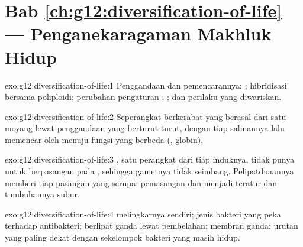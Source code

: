 \section*{Bab \ref{ch:g12:diversification-of-life} --- Penganekaragaman Makhluk Hidup}

\begin{solution}{exo:g12:diversification-of-life:1}
Penggandaan  dan pemencarannya; ;
hibridisasi bersama poliploidi; perubahan pengaturan ;
; dan perilaku yang diwariskan.
\end{solution}

\begin{solution}{exo:g12:diversification-of-life:2}
Seperangkat  berkerabat yang berasal dari satu  moyang lewat
penggandaan yang berturut-turut, dengan tiap salinannya lalu memencar
oleh  menuju fungsi yang berbeda (, globin).
\end{solution}

\begin{solution}{exo:g12:diversification-of-life:3}
, satu perangkat dari tiap  induknya, tidak punya
 untuk berpasangan pada , sehingga gametnya tidak
seimbang. Pelipatduaannya memberi tiap  pasangan yang
serupa: pemasangan dan  menjadi teratur dan tumbuhannya subur.
\end{solution}

\begin{solution}{exo:g12:diversification-of-life:4}
 melingkarnya sendiri;  jenis bakteri yang peka terhadap
 antibakteri; berlipat ganda lewat pembelahan; membran ganda;
urutan yang paling dekat dengan sekelompok bakteri yang masih hidup.
\end{solution}

